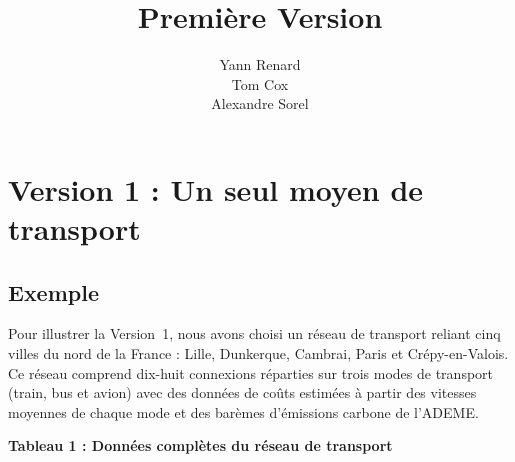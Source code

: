 \documentclass[fontsize=10pt,oneside,parskip=half]{scrreprt}
\title{Première Version}
\author{Yann Renard \\ Tom Cox \\ Alexandre Sorel}
\begin{document}

\maketitle
\pagecolor{Blanc}
{%
  \setlength{\parskip}{0pt}%
  \tableofcontents%
}

\chapter{Version 1 : Un seul moyen de transport}

\section{Exemple}

Pour illustrer la Version~1, nous avons choisi un réseau de transport reliant
cinq villes du nord de la France : Lille, Dunkerque, Cambrai, Paris et
Crépy-en-Valois. Ce réseau comprend dix-huit connexions réparties sur trois modes
de transport (train, bus et avion) avec des données de coûts estimées à partir
des vitesses moyennes de chaque mode et des barèmes d'émissions carbone de
l'ADEME.

\noindent\textbf{Tableau 1 : Données complètes du réseau de transport}

% 
\end{document}
